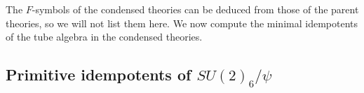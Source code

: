%

The $F$-symbols of the condensed theories can be deduced from those of the parent theories, so we will not list them here.
We now compute the minimal idempotents of the tube algebra in the condensed theories.


\subsection{Primitive idempotents of $SU(2)_6/\psi$}
\label{SU2psiIdempotents}

